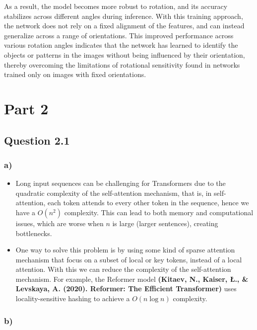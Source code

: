 \documentclass{article}
\begin{document}
As a result, the model becomes more robust to rotation, and its accuracy stabilizes across different angles during inference.
With this training approach, the network does not rely on a fixed alignment of the features, and can instead generalize across
a range of orientations. This improved performance across various rotation angles indicates that the network has learned to
identify the objects or patterns in the images without being influenced by their orientation, thereby overcoming the limitations
of rotational sensitivity found in networks trained only on images with fixed orientations.

\newpage

\section*{Part 2}

\subsection*{Question 2.1}

\subsubsection*{a)}

\begin{itemize}
    \item Long input sequences can be challenging for Transformers due to the quadratic complexity of the self-attention mechanism, 
    that is, in self-attention, each token attends to every other token in the sequence, hence we have a  
    $O(n^2)$ complexity. This can lead to both memory
    and computational issues, which are worse when $n$ is large (larger sentences), creating bottlenecks.

    \item One way to solve this problem is by using some kind of sparse attention mechanism that focus on a subset
of local or key tokens, instead of a local attention. With this we can reduce the complexity of the self-attention mechanism. For example,
the Reformer model \textbf{(Kitaev, N., Kaiser, Ł., \& Levskaya, A. (2020). Reformer: The Efficient Transformer)}
uses locality-sensitive hashing to achieve a $O(n \log n)$ complexity.
\end{itemize}

\subsubsection*{b)}
\end{document}
